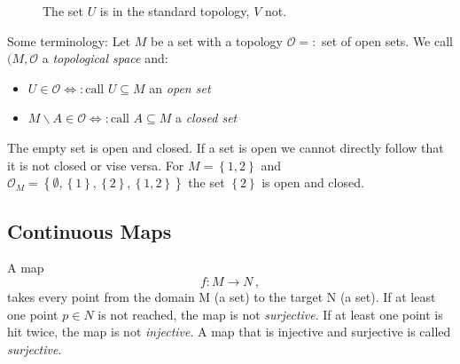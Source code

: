 \documentclass[11pt, a4paper, twocolumn]{article} %
\begin{document}
\begin{figure}[h]
\centering
{}
\caption{The set $U$ is in the standard topology, $V$ not.}
\end{figure}

Some terminology: Let $M$ be a set with a topology $\mathcal{O} =:$ set of open sets.
We call $(M, \mathcal{O}$ a \textit{topological space} and:
    \begin{itemize}
        \item $U \in \mathcal{O} \Leftrightarrow: \text{call } U\subseteq M$ an \textit{open set}
        \item $M\backslash A \in \mathcal{O} \Leftrightarrow: \text{call } A\subseteq M$  a \textit{closed set}
    \end{itemize}
\begin{note}
    The empty set is open and closed. If a set is open we cannot directly follow that it is not closed or vise versa. For $M = \left\{ 1, 2 \right\}$ and $\mathcal{O}_M = \left\{ \emptyset, \left\{ 1 \right\}, \left\{ 2 \right\}, \left\{ 1,2 \right\} \right\}$ the set $\left\{ 2 \right\}$ is open and closed.
\end{note}

\subsection{Continuous Maps}
A map
\begin{equation}
    f: M \to N\,,
\end{equation}
takes every point from the domain M (a set) to the target N (a set).
If at least one point $p\in N$ is not reached, the map is not \textit{surjective}.
If at least one point is hit twice, the map is not \textit{injective}.
A map that is injective and surjective is called \textit{surjective}.
\end{document}
